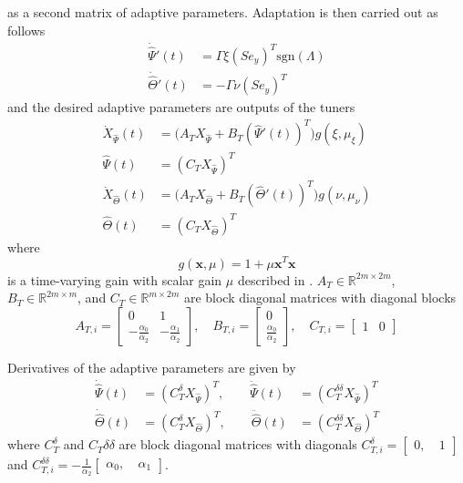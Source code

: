\documentclass[english]{ifacconf}
\begin{document}
as a second matrix of adaptive parameters. Adaptation is then carried out as follows
\begin{equation}
\begin{aligned}
\dot{\hat{\Psi}}'(t) &= \Gamma \xi (S e_y)^T \text{sgn}(\Lambda) \\
\dot{\hat{\Theta}}'(t) &= -\Gamma \nu (S e_y)^T 
\end{aligned}
\end{equation}
and the desired adaptive parameters are outputs of the tuners
\begin{equation}
\begin{aligned}
	\dot{X}_{\hat{\Psi}}(t) &= \big( A_T X_{\hat{\Psi}} + B_T (\hat{\Psi}'(t))^T \big) g(\xi, \mu_{\xi}) \\
	\hat{\Psi}(t) &= (C_T X_{\hat{\Psi}})^T \\
	\dot{X}_{\hat{\Theta}}(t) &= \big( A_T X_{\hat{\Theta}} + B_T (\hat{\Theta}'(t))^T \big) g(\nu, \mu_{\nu}) \\
	\hat{\Theta}(t) &= (C_T X_{\hat{\Theta}})^T
\end{aligned}	
\end{equation}
where
\begin{equation}
g(\mathbf{x}, \mu) = 1 + \mu \mathbf{x}^T \mathbf{x}	
\end{equation}
is a time-varying gain with scalar gain $\mu$ described in \cite{qu2016phd}. $A_T \in \mathbb{R}^{2m \times 2m}$, $B_T \in \mathbb{R}^{2m \times m}$, and $C_T \in \mathbb{R}^{m \times 2m}$ are block diagonal matrices with diagonal blocks
\begin{equation}
A_{T,i} = \begin{bmatrix}
	0 & 1\\ -\frac{\alpha_0}{\alpha_2} & -\frac{\alpha_1}{\alpha_2}
\end{bmatrix}, \quad B_{T,i} = \begin{bmatrix}
	0 \\ \frac{\alpha_0}{\alpha_2}
\end{bmatrix}, \quad C_{T,i} = \begin{bmatrix}
	1 & 0
\end{bmatrix}
\end{equation}

Derivatives of the adaptive parameters are given by
\begin{equation}
\begin{aligned}
	\dot{\hat{\Psi}}(t) &= (C_T^\delta X_{\hat{\Psi}})^T, \qquad \ddot{\hat{\Psi}}(t) &= (C_T^{\delta\delta}X_{\hat{\Psi}})^T \\
	\dot{\hat{\Theta}}(t) &= (C_T^\delta X_{\hat{\Theta}})^T, \qquad \ddot{\hat{\Theta}}(t) &= (C_T^{\delta\delta}X_{\hat{\Theta}})^T
\end{aligned}
\end{equation}
where $C_T^{\delta}$ and $C_T{\delta \delta}$ are block diagonal matrices with diagonals $C_{T,i}^{\delta} = \begin{bmatrix} 0,~ & 1	\end{bmatrix}$ and $C_{T,i}^{\delta\delta} = -\frac{1}{\alpha_2}\begin{bmatrix} \alpha_0,~ & \alpha_1 \end{bmatrix}$. 
\end{document}
